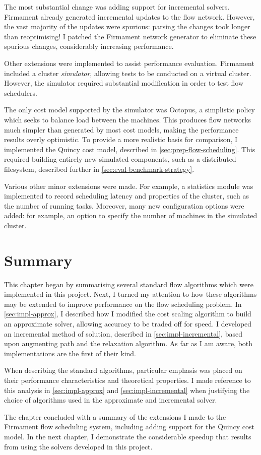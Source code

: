 The most substantial change was adding support for incremental solvers. Firmament already generated incremental updates to the flow network. However, the vast majority of the updates were spurious: parsing the changes took longer than reoptimising! I patched the Firmament network generator to eliminate these spurious changes, considerably increasing performance.

Other extensions were implemented to assist performance evaluation. Firmament included a cluster \emph{simulator}, allowing tests to be conducted on a virtual cluster. However, the simulator required substantial modification in order to test flow schedulers.

The only cost model supported by the simulator was Octopus, a simplistic policy which seeks to balance load between the machines. This produces flow networks much simpler than generated by most cost models, making the performance results overly optimistic. To provide a more realistic basis for comparison, I implemented the Quincy cost model, described in \cref{sec:prep-flow-scheduling}. This required building entirely new simulated components, such as a distributed filesystem, described further in \cref{sec:eval-benchmark-strategy}.

Various other minor extensions were made. For example, a statistics module was implemented to record scheduling latency and properties of the cluster, such as the number of running tasks. Moreover, many new configuration options were added: for example, an option to specify the number of machines in the simulated cluster.


\section{Summary}

This chapter began by summarising several standard flow algorithms which were implemented in this project. Next, I turned my attention to how these algorithms may be extended to improve performance on the flow scheduling problem. In \cref{sec:impl-approx}, I described how I modified the cost scaling algorithm to build an approximate solver, allowing accuracy to be traded off for speed. I developed an incremental method of solution, described in \cref{sec:impl-incremental}, based upon augmenting path and the relaxation algorithm. As far as I am aware, both implementations are the first of their kind.

When describing the standard algorithms, particular emphasis was placed on their performance characteristics and theoretical properties. I made reference to this analysis in \cref{sec:impl-approx} and \cref{sec:impl-incremental} when justifying the choice of algorithms used in the approximate and incremental solver.

The chapter concluded with a summary of the extensions I made to the Firmament flow scheduling system, including adding support for the Quincy cost model. In the next chapter, I demonstrate the considerable speedup that results from using the solvers developed in this project.